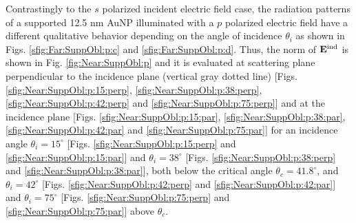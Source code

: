 Contrastingly to the $s$ polarized incident electric field case, the radiation patterns of a supported 12.5 nm AuNP illuminated with a $p$ polarized electric field have a different qualitative behavior depending on the angle of incidence $\theta_i$ as shown in Figs. \ref{sfig:Far:SuppObl:p:c} and  \ref{sfig:Far:SuppObl:p:d}. Thus, the norm of $\vb{E}^\text{ind}$ is shown in Fig. \ref{fig:Near:SuppObl:p} and it is evaluated at scattering plane perpendicular to the incidence plane (vertical gray dotted line) [Figs. \ref{sfig:Near:SuppObl:p:15:perp}, \ref{sfig:Near:SuppObl:p:38:perp}, \ref{sfig:Near:SuppObl:p:42:perp} and \ref{sfig:Near:SuppObl:p:75:perp}] and at the incidence  plane [Figs. \ref{sfig:Near:SuppObl:p:15:par}, \ref{sfig:Near:SuppObl:p:38:par}, \ref{sfig:Near:SuppObl:p:42:par} and \ref{sfig:Near:SuppObl:p:75:par}] for an incidence angle $\theta_i = 15^\circ$ [Figs. \ref{sfig:Near:SuppObl:p:15:perp}  and \ref{sfig:Near:SuppObl:p:15:par}] and  $\theta_i = 38^\circ$ [Figs. \ref{sfig:Near:SuppObl:p:38:perp}  and \ref{sfig:Near:SuppObl:p:38:par}], both below the critical angle $\theta_c = 41.8^\circ$, and $\theta_i = 42^\circ$ [Figs. \ref{sfig:Near:SuppObl:p:42:perp}  and \ref{sfig:Near:SuppObl:p:42:par}] and  $\theta_i = 75^\circ$ [Figs. \ref{sfig:Near:SuppObl:p:75:perp}  and \ref{sfig:Near:SuppObl:p:75:par}] above $\theta_c$.



